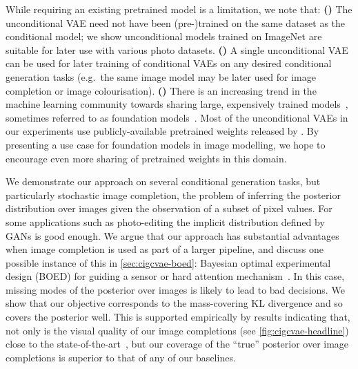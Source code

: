 While requiring an existing pretrained model is a limitation, we note that:
\textbf{()} The unconditional VAE need not have been (pre-)trained on the same
dataset as the conditional model; we show unconditional models trained on
ImageNet are suitable for later use with various photo datasets.
\textbf{()} A single unconditional VAE can be used for later training of
conditional VAEs on any desired conditional generation tasks (e.g.~the same
image model may be later used for image completion or image colourisation).
\textbf{()} There is an increasing trend in the machine learning community towards
sharing large, expensively trained models~\citep{wolf2020transformers},
sometimes referred to as foundation models~\citep{bommasani2021opportunities}.
Most of the unconditional VAEs in our experiments use publicly-available
pretrained weights released by \citet{child2020very}. By presenting a use case
for foundation models in image modelling, we hope to encourage even more sharing
of pretrained weights in this domain.

We demonstrate our approach on several conditional generation tasks, but particularly stochastic image completion, the problem of inferring the posterior distribution over images given the observation of a
subset of pixel values. For some applications such as photo-editing the implicit distribution defined by
GANs is good enough. We argue that our approach has substantial advantages when
image completion is used as part of a larger pipeline, and discuss one possible
instance of this in \cref{sec:cigcvae-boed}: Bayesian optimal experimental design (BOED)
for guiding a sensor or hard attention
mechanism~\citep{ma2018eddi,harvey2019near,rangrej2021achieving}. In this case,
missing modes of the posterior over images is likely to lead to bad decisions.
We show that our objective corresponds to the mass-covering KL divergence and so
covers the posterior well. This is supported empirically by results indicating that, not only is the visual quality of our image completions (see \cref{fig:cigcvae-headline}) close to the
state-of-the-art~\citep{zhao2021large}, but our coverage of the ``true''
posterior over image completions is superior to that of any of our baselines.


